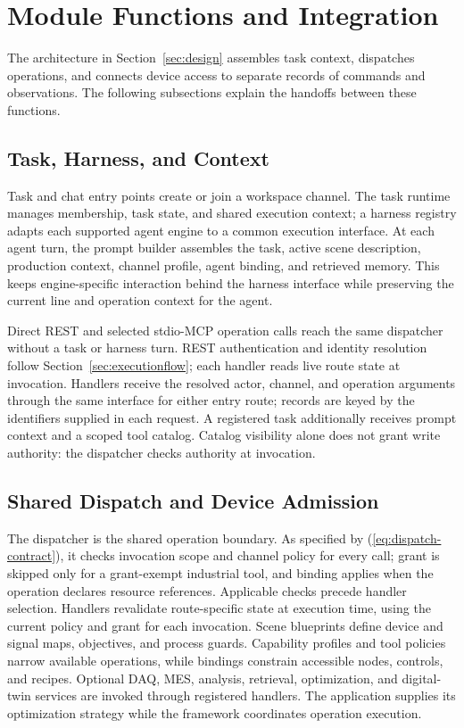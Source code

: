 \section{Module Functions and Integration}
\label{sec:modules}
The architecture in Section~\ref{sec:design} assembles task context,
dispatches operations, and connects device access to separate records of
commands and observations. The following subsections explain the handoffs
between these functions.

\subsection{Task, Harness, and Context}
Task and chat entry points create or join a workspace channel. The task
runtime manages membership, task state, and shared execution context; a
harness registry adapts each supported agent engine to a common execution
interface. At each agent turn, the prompt builder assembles the task, active
scene description, production context, channel profile, agent binding, and
retrieved memory. This keeps engine-specific interaction behind the harness
interface while preserving the current line and operation context for the
agent.

Direct REST and selected stdio-MCP operation calls reach the same dispatcher
without a task or harness turn. REST authentication and identity resolution
follow Section~\ref{sec:executionflow}; each handler reads live route state
at invocation. Handlers receive the resolved actor, channel, and operation
arguments through the same interface for either entry route; records are keyed
by the identifiers supplied in each request. A registered task additionally
receives prompt context and a scoped tool catalog. Catalog visibility alone
does not grant write authority: the dispatcher checks authority at invocation.

\subsection{Shared Dispatch and Device Admission}
\label{sec:governed}
The dispatcher is the shared operation boundary. As specified by
(\ref{eq:dispatch-contract}), it checks invocation scope and channel policy
for every call; grant is skipped only for a grant-exempt industrial tool,
and binding applies when the operation declares resource references.
Applicable checks precede handler selection. Handlers revalidate route-specific state at
execution time, using the current policy and grant for each invocation.
Scene blueprints define device and signal maps, objectives, and process
guards. Capability profiles and tool policies narrow available operations,
while bindings constrain accessible nodes, controls, and recipes. Optional
DAQ, MES, analysis, retrieval, optimization, and digital-twin services are
invoked through registered handlers. The application supplies its optimization
strategy while the framework coordinates operation execution.

